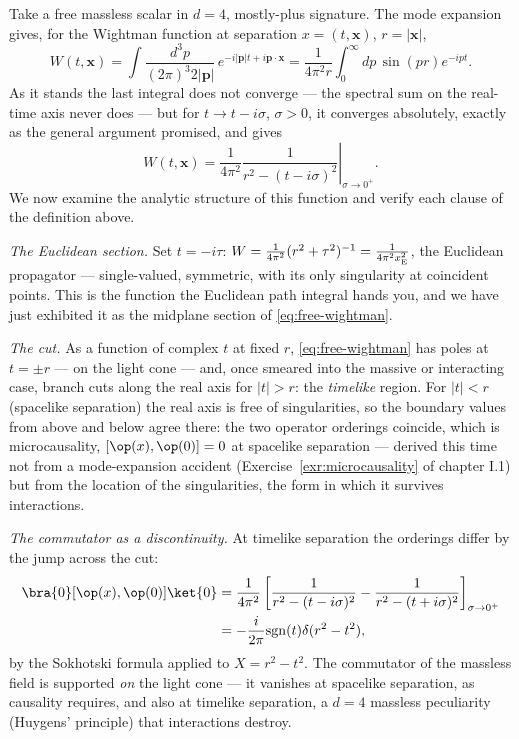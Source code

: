 \begin{eexample}
\label{ex:free-scalar-2pt}
Take a free massless scalar in $d = 4$, mostly-plus signature. The mode
expansion gives, for the Wightman function at separation $x = (t, \mathbf{x})$,
$r = |\mathbf{x}|$,
\begin{equation}
W(t, \mathbf{x}) = \int \frac{d^3p}{(2\pi)^3 2|\mathbf{p}|}\,
  e^{-i|\mathbf{p}| t + i \mathbf{p} \cdot \mathbf{x}}
= \frac{1}{4\pi^2 r} \int_0^\infty dp\, \sin(pr) e^{-ipt} .
\end{equation}
As it stands the last integral does not converge --- the spectral sum on the
real-time axis never does --- but for $t \to t - i\sigma$, $\sigma > 0$, it
converges absolutely, exactly as the general argument promised, and gives
\begin{equation}
W(t, \mathbf{x}) = \frac{1}{4\pi^2}
\left. \frac{1}{r^2 - (t - i\sigma)^2}\right|_{\sigma \to 0^+}.
\label{eq:free-wightman}
\end{equation}
We now examine the analytic structure of this function and verify each
clause of the definition above.

\emph{The Euclidean section.} Set $t = -i\tau$: $W = \frac{1}{4\pi^2}(r^2 +
\tau^2)^{-1} = \frac{1}{4\pi^2 x_{\rm E}^2}$, the Euclidean propagator ---
single-valued, symmetric, with its only singularity at coincident points. This
is the function the Euclidean path integral hands you, and we have just
exhibited it as the midplane section of \eqref{eq:free-wightman}.

\emph{The cut.} As a function of complex $t$ at fixed $r$,
\eqref{eq:free-wightman} has poles at $t = \pm r$ --- on the light cone ---
and, once smeared into the massive or interacting case, branch cuts along the
real axis for $|t| > r$: the \emph{timelike} region. For $|t| < r$ (spacelike
separation) the real axis is free of singularities, so the boundary values from
above and below agree there: the two operator orderings coincide, which is
microcausality, $[\op(x), \op(0)] = 0$ at spacelike separation --- derived this
time not from a mode-expansion accident (Exercise~\ref{exr:microcausality} of
chapter I.1) but from the location of the singularities, the form in which it
survives interactions.

\emph{The commutator as a discontinuity.} At timelike separation the orderings
differ by the jump across the cut:
\begin{align}
\bra{0}[\op(x), \op(0)]\ket{0}
&= \frac{1}{4\pi^2}\left[\frac{1}{r^2 - (t-i\sigma)^2}
 - \frac{1}{r^2 - (t+i\sigma)^2}\right]_{\sigma\to 0^+} \nonumber\\
&= -\frac{i}{2\pi}\mathrm{sgn}(t)\delta(r^2 - t^2),
\label{eq:pauli-jordan}
\end{align}
by the Sokhotski formula applied to $X = r^2 - t^2$. The commutator of the
massless field is supported \emph{on} the light cone --- it vanishes at
spacelike separation, as causality requires, and also at timelike separation,
a $d=4$ massless peculiarity (Huygens' principle) that interactions destroy.


\end{eexample}
